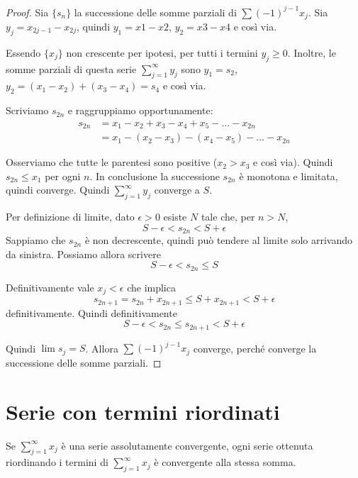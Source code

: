 \begin{proof}
Sia $\{s_n\}$ la successione delle somme parziali di $\sum (-1)^{j-1} x_j$. Sia $y_j = x_{2j-1} - x_{2j}$, quindi $y_1 = x1 - x2$, $y_2 = x3 - x4$ e così via.

Essendo $\{x_j\}$ non crescente per ipotesi, per tutti i termini $y_j \ge 0$. Inoltre, le somme parziali di questa serie $\sum_{j=1}^\infty y_j$ sono $y_1 = s_2$, $y_2 = (x_1-x_2)+(x_3-x_4) = s_4$ e così via.

Scriviamo $s_{2n}$ e raggruppiamo opportunamente:
\begin{align*}
s_{2n} &= x_1 - x_2 + x_3 - x_4 + x_5 - \ldots - x_{2n} \\
&= x_1 - (x_2 - x_3) - (x_4 - x_5) - \ldots - x_{2n}
\end{align*}

Osserviamo che tutte le parentesi sono positive ($x_2 > x_3$ e così via). Quindi $s_{2n} \le x_1$ per ogni $n$. In conclusione la successione $s_{2n}$ è monotona e limitata, quindi converge. Quindi $\sum_{j=1}^\infty y_j$ converge a $S$.

Per definizione di limite, dato $\epsilon > 0$ esiste $N$ tale che, per $n > N$,
\begin{equation*}
S - \epsilon < s_{2n} < S + \epsilon
\end{equation*}
Sappiamo che $s_{2n}$ è non decrescente, quindi può tendere al limite solo arrivando da sinistra. Possiamo allora scrivere
\begin{equation*}
S - \epsilon < s_{2n} \le S
\end{equation*}

Definitivamente vale $x_j < \epsilon$ che implica
\begin{equation*}
s_{2n+1} = s_{2n}+x_{2n+1} \le S + x_{2n+1} < S + \epsilon
\end{equation*}
definitivamente. Quindi definitivamente
\begin{equation*}
S - \epsilon < s_{2n} \le s_{2n+1} < S + \epsilon
\end{equation*}

Quindi $\lim s_j = S$. Allora $\sum (-1)^{j-1} x_j$ converge, perché converge la successione delle somme parziali.
\end{proof}

\section{Serie con termini riordinati}

\begin{theorem} 
Se $\sum_{j=1}^\infty x_j$ è una serie assolutamente convergente, ogni serie ottenuta riordinando i termini di $\sum_{j=1}^\infty x_j$ è convergente alla stessa somma.
\end{theorem} 

